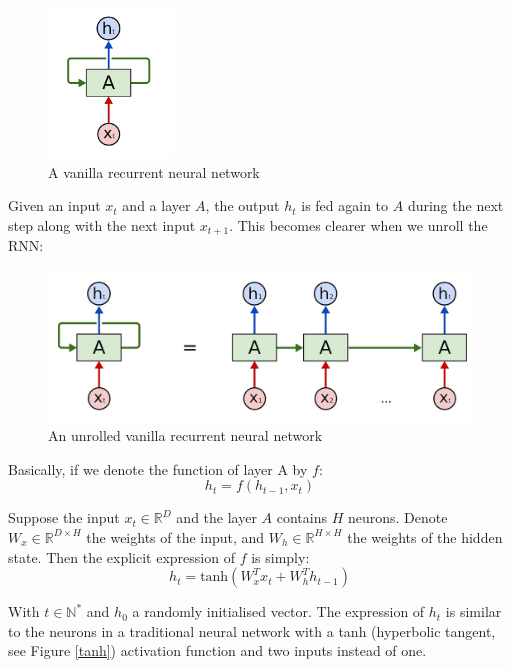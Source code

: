 \begin{figure}[H]
    \centering
    \includegraphics[width=0.3\textwidth]{Images/vanilla-rnn.png}
    \caption{A vanilla recurrent neural network \cite{colah}}
    \label{vanilla-rnn}
\end{figure}

Given an input $x_t$ and a layer $A$, the output $h_t$ is fed again to $A$ during the next step along with the next input $x_{t+1}$. This becomes clearer when we unroll the RNN:

\begin{figure}[H]
    \centering
    \includegraphics[width=\textwidth]{Images/vanilla-rnn2.png}
    \caption{An unrolled vanilla recurrent neural network \cite{colah}}
    \label{unrolled}
\end{figure}

Basically, if we denote the function of layer A by $f$:
\begin{equation}
    h_t = f(h_{t-1}, x_t)
\end{equation}

Suppose the input $x_t \in \mathbb{R}^{D}$ and the layer $A$ contains $H$ neurons. Denote $W_x \in \mathbb{R}^{D\times H}$ the weights of the input, and $W_h \in \mathbb{R}^{H\times H}$ the weights of the hidden state. Then the explicit expression of $f$ is simply:
\begin{equation}
    h_t = \text{tanh}(W_x^T x_t + W_h^T h_{t-1})
\end{equation}

With $t \in \mathbb{N}^*$ and $h_0$ a randomly initialised vector. The expression of $h_t$ is similar to the neurons in a traditional neural network with a tanh (hyperbolic tangent, see Figure \ref{tanh}) activation function and two inputs instead of one.


